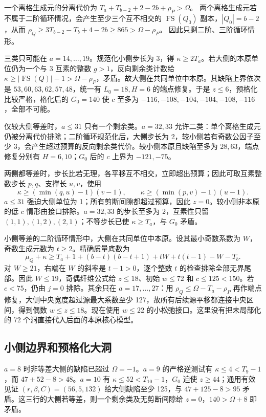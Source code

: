 \documentclass[11pt,a4paper]{article}
\begin{document}
一个离格生成元的分离代价为 \(T_a+T_{b-2}+2-2b+\rho_P>\Omega\)。
两个离格生成元若不属于二阶循环情况，会产生至少三个互不相交的
\(\operatorname{FS}(Q_0)\) 副本，\(|Q_0|=b-2\)，从而
\(\rho_Q\ge3T_{b-2}-T_b+4-2b\ge865>\Omega-\rho_P\)。
因此只剩二阶、三阶循环情形。

三类只可能在 \(a=14,\ldots,19\)。规范化小侧步长为 3，得
\(\kappa\ge2T_a\)。若大侧的本原单位仍为一个与 3 互素的整数
\(g>1\)，反向剩余类计数给
\(\kappa\ge|\operatorname{FS}(Q)|-1>\Omega-\rho_P\)，矛盾。故大侧在共同单位中本原。其缺陷上界依次是
\(53,60,63,62,57,48\)，统一有 \(L_0=18,H=6\) 的端点修复。于是
\(z\le6\)，预格化比较严格，格化后的 \(G_0=140\) 使 \(c\) 至多为
\(-116,-108,-104,-104,-108,-116\)，全部不可能。

仅较大侧等差时，\(a\le31\) 只有一个剩余类。\(a=32,33\)
允许二类：单个离格生成元仍被分离代价排除；二阶循环规范化后，大侧步长为
2，较小侧若有奇数公因子至少
3，会产生超过预算的反向剩余类代价。较小侧本原且缺陷至多为
\(28,63\)，端点修复分别有 \(H=6,10\)；\(G_0\) 后的 \(c\) 上界为
\(-121,-75\)。

两侧都等差时，步长比若无理，各平移互不相交，立即超出预算；因此可取互素整数步长
\(p,q\)、支撑长 \(u,v\)，使用 \[
 \kappa\ge(\min(q,u)-1)(v-1),\qquad
 \kappa\ge(\min(p,v)-1)(u-1).
\] \(a\le31\) 强迫大侧单位为 1；所有剪断间隙都超过预算，因此
\(z=0\)。较小侧非本原的低 \(c\) 情形由接口排除。\(a=32,33\) 的步长至多为
2，互素性只留 \((1,1),(1,2),(2,1)\)；不等步长已使 \(\kappa\ge T_a\)，与
\(G_0\) 矛盾。

小侧等差的二阶循环情形中，大侧在共同单位中本原。设其最小奇数系数为
\(W\)，奇数生成元数为 \(t\ge2\)。精确质量底数为 \[
 \mu_Q+\kappa\ge T_a+1+(b-t)(b-t+1)+tW+t(t-1)-W-T_b.
\] 对 \(W\ge21\)，右端在 \(W\) 的斜率是 \(t-1>0\)，逐个整数 \(t\)
的检查排除全部无界尾部。因此 \(W\le19\)，奇偶纤维公式给 \(z\le18\)、初始
\(w\le72\) 和 \(c\le125<150\)。若 \(c<75\)，仍由 \(j=0\) 排除。其余只在
\(a=17,\ldots,27\)：用 \(\rho_Q\le\Omega-T_a-\rho_P\)
再作端点修复，大侧中央宽度超过源最大系数至少
127，故所有后续源平移都连接中央区间，得到偶数 \(w\le z\le18\)。现在使用
\(w\le22\) 的小松弛接口。这里没有把未局部化的 72
个洞直接代入后面的本原核心模型。

\hypertarget{ux5c0fux4fa7ux8fb9ux754cux548cux9884ux683cux5316ux5927ux6d1e}{%
\subsection{小侧边界和预格化大洞}\label{ux5c0fux4fa7ux8fb9ux754cux548cux9884ux683cux5316ux5927ux6d1e}}

\(a=8\) 时非等差大侧的缺陷已超过 \(\Omega=-1\)。\(a=9\) 的严格逆测试有
\(\kappa\le4<T_9-1\)，而 \(47+52-8>48\)。\(a=10\) 有
\(\kappa\le52<T_{10}-1\)，\(G_0\) 迫使 \(z\ge44\)；通用有效见证
\((r,\beta,C)=(56,5,132)\) 给大侧缺陷至少 125，与 \(47+125-8>95\)
矛盾。这三行的大侧若等差，则一个剩余类及无剪断间隙给
\(z=0\)，\(140>\Omega+8\) 即矛盾。
\end{document}
